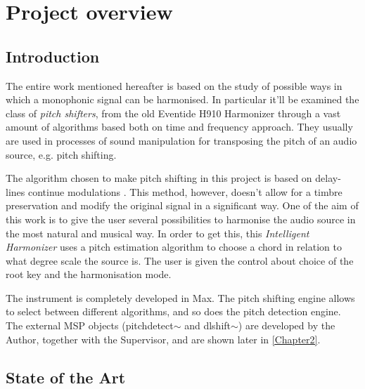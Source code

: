 
\chapter{Project overview} %

\label{Chapter1} %



\section{Introduction}
\label{sec:intro}

The entire work mentioned hereafter is based on the study of possible ways in which a monophonic signal can be harmonised.
In particular it'll be examined the class of \emph{pitch shifters}, from the old Eventide H910 Harmonizer through a vast amount of algorithms based both on time and frequency approach. They usually are used in processes of sound manipulation for transposing the pitch of an audio source, e.g. pitch shifting.

The algorithm chosen to make pitch shifting in this project is based on delay-lines continue modulations \cite{lazzarini2010audio}. This method, however, doesn't allow for a timbre preservation \cite{zolder2011dafx} and modify the original signal in a significant way. 
One of the aim of this work is to give the user several possibilities to harmonise the audio source in the most natural and musical way. In order to get this, this \emph{Intelligent Harmonizer} uses a pitch estimation algorithm to choose a chord in relation to what degree scale the source is. The user is given the control about choice of the root key and the harmonisation mode.

The instrument is completely developed in Max. The pitch shifting engine allows to select between different algorithms, and so does the pitch detection engine. The external MSP objects (pitchdetect$\sim$ and dlshift$\sim$) are developed by the Author, together with the Supervisor, and are shown later in \ref{Chapter2}.
\clearpage

\section{State of the Art}

